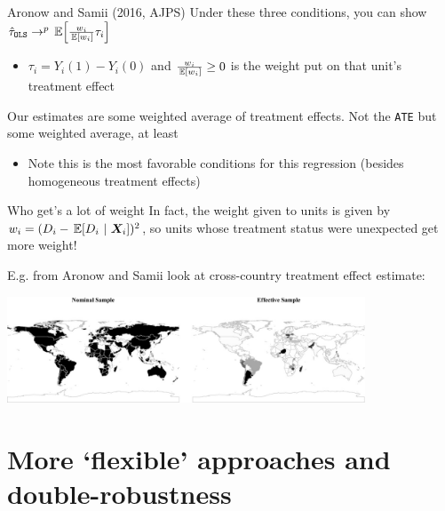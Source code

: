 \documentclass[aspectratio=169,t,11pt,table]{beamer}
\begin{document}
\begin{frame}{Aronow and Samii (2016, AJPS)}
  Under these three conditions, you can show $\hat{\tau}_{\texttt{OLS}} \to^p \expec{\frac{w_i}{\expec{w_i}} \tau_i}$
  \begin{itemize}
    \item $\tau_i = Y_i(1) - Y_i(0)$ and $\frac{w_i}{\expec{w_i}} \geq 0$ is the weight put on that unit's treatment effect
  \end{itemize}

  Our estimates are some weighted average of treatment effects. Not the \texttt{ATE} but some weighted average, at least
  \begin{itemize}
    \item Note this is the most favorable conditions for this regression (besides homogeneous treatment effects)
  \end{itemize}
\end{frame}

\begin{frame}{Who get's a lot of weight}
  In fact, the weight given to units is given by $w_i = (D_i - \expec{D_i}{\bm{X}_i})^2$, so units whose treatment status were unexpected get more weight!

  \pause
  E.g. from Aronow and Samii look at cross-country treatment effect estimate:
  \begin{center}  
    \includegraphics[width = 0.8\textwidth]{figures/arronow_samii_2016.jpeg}
  \end{center}
\end{frame}



\section{More `flexible' approaches and double-robustness}
\end{document}
